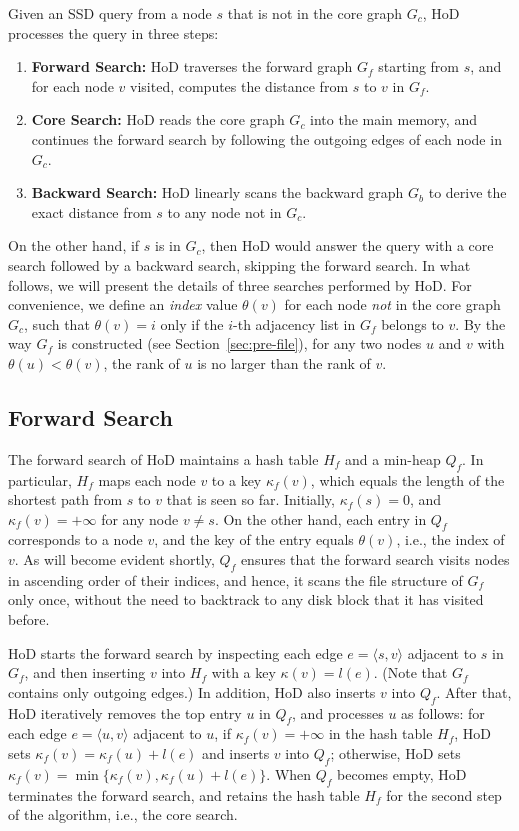 \documentclass{sig-alternate}
\def\GC{G_c}
\def\GF{G_f}
\def\GB{G_b}
\def\HF{H_f}
\def\QF{Q_f}
\def\kf{\kappa_f}
\begin{document}
\begin{sloppy}
Given an SSD query from a node $s$ that is not in the core graph $\GC$, HoD processes the query in three steps:
\begin{enumerate}[itemsep = 0.5mm, topsep = 2mm]
\item {\bf Forward Search:} HoD traverses the forward graph $\GF$ starting from $s$, and for each node $v$ visited, computes the distance from $s$ to $v$ in $\GF$.

\item {\bf Core Search:} HoD reads the core graph $\GC$ into the main memory, and continues the forward search by following the outgoing edges of each node in $\GC$.

\item {\bf Backward Search:} HoD linearly scans the backward graph $\GB$ to derive the exact distance from $s$ to any node not in $\GC$.
\end{enumerate}
On the other hand, if $s$ is in $\GC$, then HoD would answer the query with a core search followed by a backward search, skipping the forward search. In what follows, we will present the details of three searches performed by HoD. For convenience, we define an {\em index} value $\theta(v)$ for each node {\em not} in the core graph $\GC$, such that $\theta(v) = i$ only if the $i$-th adjacency list in $\GF$ belongs to $v$. By the way $\GF$ is constructed (see Section~\ref{sec:pre-file}), for any two nodes $u$ and $v$ with $\theta(u) < \theta(v)$, the rank of $u$ is no larger than the rank of $v$.

\subsection{Forward Search} \label{sec:sssp-forward}

The forward search of HoD maintains a hash table $\HF$ and a min-heap $\QF$. In particular, $\HF$ maps each node $v$ to a key $\kf(v)$, which equals the length of the shortest path from $s$ to $v$ that is seen so far. Initially, $\kf(s) = 0$, and $\kf(v) = +\infty$ for any node $v \ne s$. On the other hand, each entry in $\QF$ corresponds to a node $v$, and the key of the entry equals $\theta(v)$, i.e., the index of $v$. As will become evident shortly, $\QF$ ensures that the forward search visits nodes in ascending order of their indices, and hence, it scans the file structure of $\GF$ only once, without the need to backtrack to any disk block that it has visited before.

HoD starts the forward search by inspecting each edge $e = \langle s, v\rangle$ adjacent to $s$ in $\GF$, and then inserting $v$ into $\HF$ with a key $\kappa(v) = l(e)$. (Note that $\GF$ contains only outgoing edges.) In addition, HoD also inserts $v$ into $\QF$. After that, HoD iteratively removes the top entry $u$ in $\QF$, and processes $u$ as follows: for each edge $e = \langle u, v\rangle$ adjacent to $u$, if $\kf(v) = +\infty$ in the hash table $\HF$, HoD sets $\kf(v) = \kf(u) + l(e)$ and inserts $v$ into $\QF$; otherwise, HoD sets $\kf(v) = \min\{\kf(v), \kf(u) + l(e)\}$. When $\QF$ becomes empty, HoD terminates the forward search, and retains the hash table $\HF$ for the second step of the algorithm, i.e., the core search.


\end{sloppy}
\end{document}
